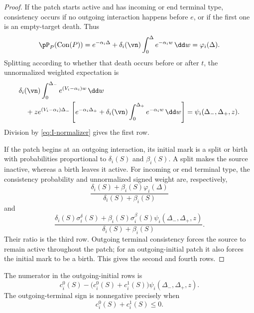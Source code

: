 \begin{proof}
If the patch starts active and has incoming or end terminal type,
consistency occurs if no outgoing interaction happens before \(e\), or
if the first one is an empty-target death. Thus
\begin{equation}
  \pP_P(\operatorname{Con}(P))
  =
  e^{-\alpha_i\Delta}
  +
  \delta_i(\vn)
  \int_0^\Delta e^{-\alpha_iw}\,\dd w
  =
  \varphi_i(\Delta).
  \label{eq:I-normalizer}
\end{equation}
Splitting according to whether that death occurs before or after
\(t\), the unnormalized weighted expectation is
\begin{align*}
  &\delta_i(\vn)
  \int_0^{\Delta_-}e^{(V_i-\alpha_i)w}\,\dd w
  \\
  &\quad+
  z e^{(V_i-\alpha_i)\Delta_-}
  \left[
    e^{-\alpha_i\Delta_+}
    +
    \delta_i(\vn)
    \int_0^{\Delta_+}e^{-\alpha_iw}\,\dd w
  \right]
  =
  \psi_i(\Delta_-,\Delta_+,z).
\end{align*}
Division by \eqref{eq:I-normalizer} gives the first row.

If the patch begins at an outgoing interaction, its initial mark is a
split or birth with probabilities proportional to
\(\delta_i(S)\) and \(\beta_i(S)\). A split makes the source inactive,
whereas a birth leaves it active. For incoming or end terminal type,
the consistency probability and unnormalized signed weight are,
respectively,
\[
  \frac{
    \delta_i(S)+\beta_i(S)\varphi_i(\Delta)
  }{
    \delta_i(S)+\beta_i(S)
  }
\]
and
\[
  \frac{
    \delta_i(S)\sigma_i^\delta(S)
    +
    \beta_i(S)\sigma_i^\beta(S)
    \psi_i(\Delta_-,\Delta_+,z)
  }{
    \delta_i(S)+\beta_i(S)
  }.
\]
Their ratio is the third row. Outgoing terminal consistency forces the
source to remain active throughout the patch; for an outgoing-initial
patch it also forces the initial mark to be a birth. This gives the
second and fourth rows.
\end{proof}

\begin{corollary}
\label{cor:spin-rate-numerator}
The numerator in the outgoing-initial rows is
\begin{equation}
  c_i^0(S)
  -
  \bigl(c_i^0(S)+c_i^1(S)\bigr)
  \psi_i(\Delta_-,\Delta_+,z).
  \label{eq:OI-spin-numerator}
\end{equation}
The outgoing-terminal sign is nonnegative precisely when
\[
  c_i^0(S)+c_i^1(S)\le0.
\]
\end{corollary}

